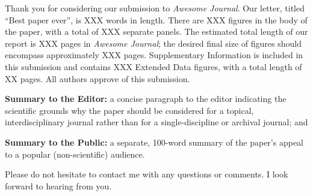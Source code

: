 \begin{newlfm}


%


Thank you for considering our submission to \textit{Awesome Journal}. Our letter, titled ``Best paper ever'', is XXX words in length. There are XXX figures in the body of the paper, with a total of XXX separate panels. The estimated total length of our report is XXX pages in \textit{Awesome Journal}; the desired final size of figures should encompass approximately XXX pages. Supplementary Information is included in this submission and contains XXX Extended Data figures, with a total length of XX pages. All authors approve of this submission. 

\textbf{Summary to the Editor:}  a concise paragraph to the editor indicating the scientific grounds why the paper should be considered for a topical, interdisciplinary journal rather than for a single-discipline or archival journal; and

\textbf{Summary to the Public:}  a separate, 100-word summary of the paper's appeal to a popular (non-scientific) audience.


Please do not hesitate to contact me with any questions or comments. I look forward to hearing from you. 


\end{newlfm}
